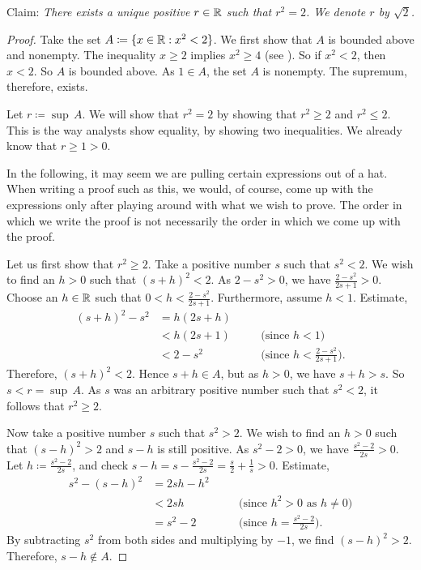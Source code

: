 \begin{example} \label{example:sqrt2}
Claim: \emph{There exists a unique positive
$r \in {\mathbb{R}}$ such that $r^2 = 2$.  We denote $r$ by $\sqrt{2}$.}

\begin{proof}
Take the set
$A \coloneqq \{ x \in {\mathbb{R}} : x^2 < 2 \}$.  We first show that $A$ is bounded above and
nonempty.  The inequality $x \geq 2$ implies $x^2 \geq 4$
(see ).
So if $x^2 < 2$, then $x < 2$.  So $A$ is bounded above.
As $1 \in A$, the set $A$ is nonempty.  The supremum, therefore, exists.

Let $r \coloneqq \sup\, A$.  We will show that $r^2 = 2$ by showing
that $r^2 \geq 2$ and $r^2 \leq 2$.  This is the way analysts show
equality, by showing two inequalities.
We already know that $r \geq 1 > 0$.

In the following, it may seem we are pulling certain expressions out of
a hat.  When writing a proof such as this, we would, of course, come up with
the expressions only after playing around with what we wish to prove.  The
order in which we write the proof is not necessarily the order in which we
come up with the proof.

Let us first show that $r^2 \geq 2$.
Take a positive number $s$ such that $s^2 < 2$.  We wish to find an $h > 0$
such that ${(s+h)}^2 < 2$.
As $2-s^2 > 0$, we have $\frac{2-s^2}{2s+1} > 0$.
Choose an $h \in {\mathbb{R}}$ such that
$0 < h < \frac{2-s^2}{2s+1}$.
Furthermore, assume $h < 1$.  Estimate,
\begin{equation*}
\begin{aligned}
{(s+h)}^2 - s^2 & = h(2s + h) \\
 & < h(2s+1) & & \quad \bigl(\text{since } h < 1\bigr) \\
 & < 2-s^2 & & \quad \bigl(\text{since } h < \tfrac{2-s^2}{2s+1} \bigr) .
\end{aligned}
\end{equation*}
Therefore, ${(s+h)}^2 < 2$.  Hence $s+h \in A$, but as $h > 0$,
we have $s+h > s$.  So $s < r = \sup\, A$.  As $s$ was an arbitrary
positive number such that $s^2 < 2$, it follows that $r^2 \geq 2$.


Now take a positive number $s$ such that
$s^2 > 2$.  We wish to find an $h > 0$ such that
${(s-h)}^2 > 2$ and $s-h$ is still positive.
As $s^2-2 > 0$, we have $\frac{s^2-2}{2s} > 0$.
Let $h \coloneqq \frac{s^2-2}{2s}$,
and check $s-h=s-\frac{s^2-2}{2s} = \frac{s}{2}+\frac{1}{s} > 0$.
Estimate,
\begin{equation*}
\begin{aligned}
s^2 - {(s-h)}^2 & = 2sh - h^2 \\
 & < 2sh & & \quad \bigl( \text{since } h^2 > 0 \text{ as } h \neq 0 \bigr) \\
 & = s^2-2 & & \quad \bigl( \text{since } h = \tfrac{s^2-2}{2s} \bigr) .
\end{aligned}
\end{equation*}
By subtracting $s^2$ from both sides and multiplying by $-1$, we find
${(s-h)}^2 > 2$.  Therefore, $s-h \notin A$.


\end{proof}
\end{example}
